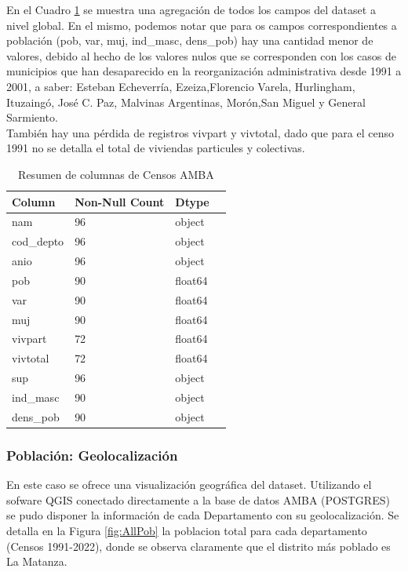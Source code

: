 \documentclass{article}
\theoremstyle{mytheoremstyle}
\theoremstyle{mytheoremstyle}
\theoremstyle{myproblemstyle}
\begin{document}
  En el Cuadro \ref{tab:summaryCensos} se muestra una agregación de todos los campos del dataset a nivel global. 
  En el mismo, podemos notar que para os campos correspondientes a población (pob, var, muj, ind\_masc, dens\_pob) 
  hay una cantidad menor de valores, debido al hecho de los valores nulos que se corresponden con los casos de municipios 
  que han desaparecido en la reorganización administrativa desde 1991 a 2001, a saber: Esteban Echeverría, Ezeiza,Florencio Varela, 
  Hurlingham, Ituzaingó, José C. Paz, Malvinas Argentinas, Morón,San Miguel y General Sarmiento. \\
  También hay una pérdida de registros vivpart y vivtotal, dado que para el censo 1991 no se detalla el total de viviendas particules y colectivas.

\begin{table}[htb]
    \centering
    \begin{tabular}{llll}
        \toprule
        \textbf{Column} & \textbf{Non-Null Count} & \textbf{Dtype} \\
        \midrule
        nam & 96 & object \\
        cod\_depto & 96 & object \\
        anio & 96 & object \\
        pob & 90 & float64 \\
        var & 90 & float64 \\
        muj & 90 & float64 \\
        vivpart & 72 & float64 \\
        vivtotal & 72 & float64 \\
        sup & 96 & object \\
        ind\_masc & 90 & object \\
        dens\_pob & 90 & object \\
        \bottomrule
    \end{tabular}
  \caption{Resumen de columnas de Censos AMBA}
    \label{tab:summaryCensos}
\end{table}

\subsubsection{Población: Geolocalización}

En este caso se ofrece una visualización geográfica del dataset. Utilizando el sofware QGIS conectado directamente a la base de 
datos AMBA (POSTGRES) se pudo disponer la información de cada Departamento con su geolocalización.
Se detalla en la Figura \ref{fig:AllPob} la poblacion total para cada departamento (Censos 1991-2022), donde se observa claramente que el distrito más poblado
es La Matanza.
\end{document}
